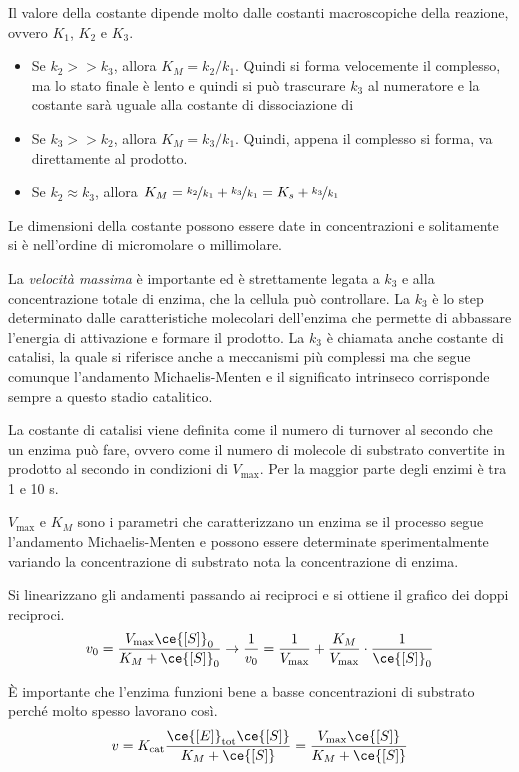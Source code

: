 Il valore della costante dipende molto dalle costanti macroscopiche della reazione, ovvero $K_1$, $K_2$ e $K_3$.
\begin{itemize}
\item Se $k_2 >> k_3$, allora $K_M = k_2/k_1$. Quindi si forma velocemente il complesso, ma lo stato finale è lento e quindi si può trascurare $k_3$ al numeratore e la costante sarà uguale alla costante di dissociazione di 
\item Se $k_3 >> k_2$, allora $K_M = k_3/k_1$. Quindi, appena il complesso si forma, va direttamente al prodotto.
\item Se $k_2 \approx k_3$, allora $K_M = \nicefrac{k_2}{k_1} + \nicefrac{k_3}{k_1} = K_s + \nicefrac{k_3}{k_1}$ 
\end{itemize}
Le dimensioni della costante possono essere date in concentrazioni e solitamente si è
nell’ordine di micromolare o millimolare.

La \emph{velocità massima} è importante ed è strettamente legata a $k_3$ e alla concentrazione
totale di enzima, che la cellula può controllare.
La $k_3$ è lo step determinato dalle caratteristiche molecolari dell’enzima che permette
di abbassare l’energia di attivazione e formare il prodotto.
La $k_3$ è chiamata anche costante di catalisi, la quale si riferisce anche a meccanismi più complessi ma che segue comunque l’andamento Michaelis-Menten e il significato intrinseco corrisponde sempre a questo stadio catalitico.

La costante di catalisi viene definita come il numero di turnover al secondo che un
enzima può fare, ovvero come il numero di molecole di substrato convertite in prodotto al secondo
in condizioni di $V_{\text{max}}$. Per la maggior parte degli enzimi è tra 1 e 10 s.

$V_{\text{max}}$ e $K_M$ sono i parametri che caratterizzano un enzima se il processo segue l’andamento Michaelis-Menten e possono essere determinate sperimentalmente variando la
concentrazione di substrato nota la concentrazione di enzima.

Si linearizzano gli andamenti passando ai reciproci e si ottiene il grafico dei doppi reciproci.
\[
v_0 = \frac{V_{\text{max}} \ce{[S]}_0}{K_M + \ce{[S]}_0} \rightarrow \frac{1}{v_0} = \frac{1}{V_{\text{max}}}  + \frac{K_M}{V_{\text{max}}} \cdot \frac{1}{\ce{[S]}_0}
\]


È importante che l’enzima funzioni bene a basse concentrazioni di substrato perché molto spesso lavorano così.
\[
v = K_{\text{cat}} \frac{\ce{[E]}_{\text{tot}} \ce{[S]}}{K_M + \ce{[S]}} = \frac{V_{\text{max}} \ce{[S]}}{K_M + \ce{[S]}}
\]

